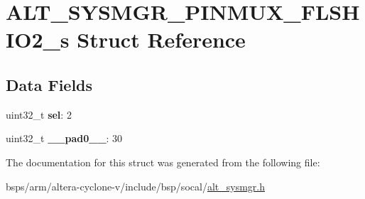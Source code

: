 \hypertarget{structALT__SYSMGR__PINMUX__FLSHIO2__s}{}\section{A\+L\+T\+\_\+\+S\+Y\+S\+M\+G\+R\+\_\+\+P\+I\+N\+M\+U\+X\+\_\+\+F\+L\+S\+H\+I\+O2\+\_\+s Struct Reference}
\label{structALT__SYSMGR__PINMUX__FLSHIO2__s}
\subsection*{Data Fields}
\begin{DoxyCompactItemize}
\item 
\mbox{\label{structALT__SYSMGR__PINMUX__FLSHIO2__s_af784fae897a6c13e3d2bb7c71b02843c}} 
uint32\+\_\+t {\bfseries sel}\+: 2
\item 
\mbox{\label{structALT__SYSMGR__PINMUX__FLSHIO2__s_ab86af91f4f5d861d3a72d43917e87a0c}} 
uint32\+\_\+t {\bfseries \+\_\+\+\_\+pad0\+\_\+\+\_\+}\+: 30
\end{DoxyCompactItemize}


The documentation for this struct was generated from the following file\+:\begin{DoxyCompactItemize}
\item 
bsps/arm/altera-\/cyclone-\/v/include/bsp/socal/\mbox{\hyperlink{alt__sysmgr_8h}{alt\+\_\+sysmgr.\+h}}\end{DoxyCompactItemize}
